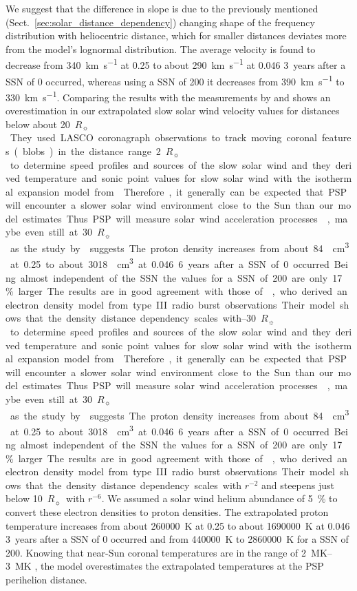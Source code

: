 \documentclass[]{aa}
\newcommand{\Rs}{$R_\sun{}$}
\begin{document}
	We suggest that the difference in slope is due to the previously mentioned (Sect.~\ref{sec:solar_distance_dependency}) changing shape of the frequency distribution with heliocentric distance, which for smaller distances deviates more from the model’s lognormal distribution.
	The average velocity is found to decrease from \SI{340}{\km\per\s} at \SI{0.25}{\au} to about \SI{290}{\km\per\s} at \SI{0.046}{\au} 3~years after a SSN of 0 occurred, whereas using a SSN of 200 it decreases from \SI{390}{\km\per\s} to \SI{330}{\km\per\s}. Comparing the results with the measurements by \citet{Sheeley1997} and \citet{Wang2000} shows an overestimation in our extrapolated slow solar wind velocity values for distances below about \SI{20}{\Rs}. They used LASCO coronagraph observations to track moving coronal features (blobs) in the distance range \SIrange{2}{30}{\Rs} to determine speed profiles and sources of the slow solar wind and they derived temperature and sonic point values for slow solar wind with the isothermal expansion model from \citet{Parker1958}. Therefore, it generally can be expected that PSP will encounter a slower solar wind environment close to the Sun than our model estimates. Thus PSP will measure solar wind acceleration processes \citep{McComas2008}, maybe even still at \SI{30}{\Rs} as the study by \citet{Sheeley1997} suggests.
	The proton density increases from about \SI{84}{\per\cm\cubed} at \SI{0.25}{\au} to about \SI{3018}{\per\cm\cubed} at \SI{0.046}{\au} 6~years after a SSN of 0 occurred. Being almost independent of the SSN the values for a SSN of 200 are only \SI{17}{\%} larger. The results are in good agreement with those of \citet{Leblanc1998}, who derived an electron density model from type~III radio burst observations. Their model shows that the density distance dependency scales with $r^{-2}$ and steepens just below \SI{10}{\Rs} with $r^{-6}$. We assumed a solar wind helium abundance of \SI{5}{\%} to convert these electron densities to proton densities.
	The extrapolated proton temperature increases from about \SI{260000}{\K} at \SI{0.25}{\au} to about \SI{1690000}{\K} at \SI{0.046}{\au} 3~years after a SSN of 0 occurred and from \SI{440000}{\K} to \SI{2860000}{\K} for a SSN of 200. Knowing that near-Sun coronal temperatures are in the range of \SIrange{2}{3}{\mega\K} \citep{Billings1959,Liebenberg1975}, the model overestimates the extrapolated temperatures at the PSP perihelion distance.
\end{document}
